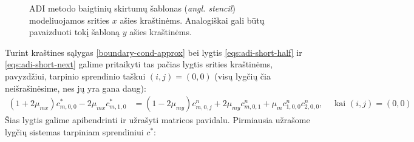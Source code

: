 \begin{figure}[h!]
  \centering
  \caption{ADI metodo baigtinių skirtumų šablonas (\textit{angl. stencil}) modeliuojamos srities $x$ ašies kraštinėms. Analogiškai gali būtų pavaizduoti tokį šabloną $y$ ašies kraštinėms. }
  \label{fig:ghost-points}
\end{figure}
Turint kraštines sąlygas \eqref{boundary-cond-approx} bei lygtis \eqref{eqs:adi-short-half} ir \eqref{eqs:adi-short-next} galime pritaikyti tas pačias lygtis srities kraštinėms, pavyzdžiui, tarpinio sprendinio taškui $(i,j)=(0,0)$ (visų lygčių čia neišrašinėsime, nes jų yra gana daug):
\begin{align} \label{eqs:adi-short-half-boundary}
  (1+2\mu_{mx})c^{*}_{m,0,0}-2\mu_{mx}c^{*}_{m,1,0}
  &= (1-2\mu_{my})c^n_{m,0,j}+2\mu_{my}c^n_{m,0,1}+\mu_m c^n_{1,0,0}c^n_{2,0,0},\quad\text{ kai } (i, j) = (0, 0)
\end{align}
Šias lygtis galime apibendrinti ir užrašyti matricos pavidalu. Pirmiausia užrašome lygčių sistemas tarpiniam sprendiniui $c^*$:
